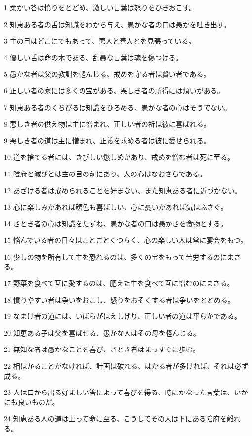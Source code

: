 \par 1 柔かい答は憤りをとどめ、激しい言葉は怒りをひきおこす。
\par 2 知恵ある者の舌は知識をわかち与え、愚かな者の口は愚かを吐き出す。
\par 3 主の目はどこにでもあって、悪人と善人とを見張っている。
\par 4 優しい舌は命の木である、乱暴な言葉は魂を傷つける。
\par 5 愚かな者は父の教訓を軽んじる、戒めを守る者は賢い者である。
\par 6 正しい者の家には多くの宝がある、悪しき者の所得には煩いがある。
\par 7 知恵ある者のくちびるは知識をひろめる、愚かな者の心はそうでない。
\par 8 悪しき者の供え物は主に憎まれ、正しい者の祈は彼に喜ばれる。
\par 9 悪しき者の道は主に憎まれ、正義を求める者は彼に愛せられる。
\par 10 道を捨てる者には、きびしい懲しめがあり、戒めを憎む者は死に至る。
\par 11 陰府と滅びとは主の目の前にあり、人の心はなおさらである。
\par 12 あざける者は戒められることを好まない、また知恵ある者に近づかない。
\par 13 心に楽しみがあれば顔色も喜ばしい、心に憂いがあれば気はふさぐ。
\par 14 さとき者の心は知識をたずね、愚かな者の口は愚かさを食物とする。
\par 15 悩んでいる者の日々はことごとくつらく、心の楽しい人は常に宴会をもつ。
\par 16 少しの物を所有して主を恐れるのは、多くの宝をもって苦労するのにまさる。
\par 17 野菜を食べて互に愛するのは、肥えた牛を食べて互に憎むのにまさる。
\par 18 憤りやすい者は争いをおこし、怒りをおそくする者は争いをとどめる。
\par 19 なまけ者の道には、いばらがはえしげり、正しい者の道は平らかである。
\par 20 知恵ある子は父を喜ばせる、愚かな人はその母を軽んじる。
\par 21 無知な者は愚かなことを喜び、さとき者はまっすぐに歩む。
\par 22 相はかることがなければ、計画は破れる、はかる者が多ければ、それは必ず成る。
\par 23 人は口から出る好ましい答によって喜びを得る、時にかなった言葉は、いかにも良いものだ。
\par 24 知恵ある人の道は上って命に至る、こうしてその人は下にある陰府を離れる。
